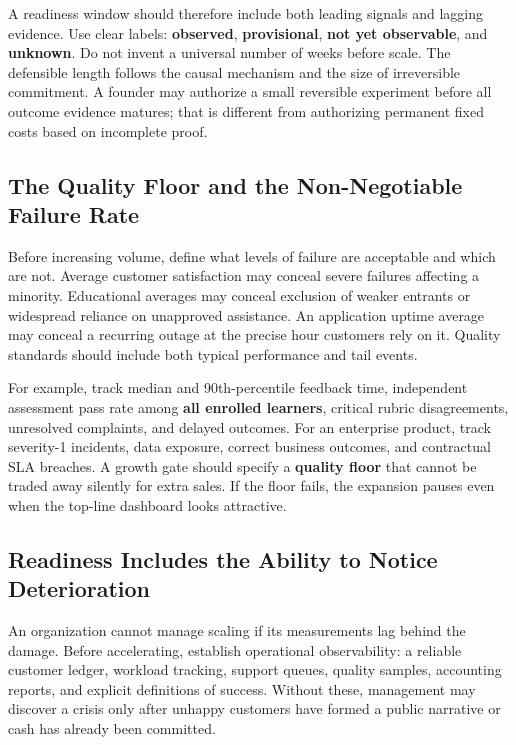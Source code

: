 A readiness window should therefore include both leading signals and lagging evidence. Use clear labels: \textbf{observed}, \textbf{provisional}, \textbf{not yet observable}, and \textbf{unknown}. Do not invent a universal number of weeks before scale. The defensible length follows the causal mechanism and the size of irreversible commitment. A founder may authorize a small reversible experiment before all outcome evidence matures; that is different from authorizing permanent fixed costs based on incomplete proof.

\subsection{The Quality Floor and the Non-Negotiable Failure Rate}
\label{sec:quality_floor_failure_rate}

Before increasing volume, define what levels of failure are acceptable and which are not. Average customer satisfaction may conceal severe failures affecting a minority. Educational averages may conceal exclusion of weaker entrants or widespread reliance on unapproved assistance. An application uptime average may conceal a recurring outage at the precise hour customers rely on it. Quality standards should include both typical performance and tail events.

For example, track median and 90th-percentile feedback time, independent assessment pass rate among \textbf{all enrolled learners}, critical rubric disagreements, unresolved complaints, and delayed outcomes. For an enterprise product, track severity-1 incidents, data exposure, correct business outcomes, and contractual SLA breaches. A growth gate should specify a \textbf{quality floor} that cannot be traded away silently for extra sales. If the floor fails, the expansion pauses even when the top-line dashboard looks attractive.

\subsection{Readiness Includes the Ability to Notice Deterioration}
\label{sec:ability_to_notice_deterioration}

An organization cannot manage scaling if its measurements lag behind the damage. Before accelerating, establish operational observability: a reliable customer ledger, workload tracking, support queues, quality samples, accounting reports, and explicit definitions of success. Without these, management may discover a crisis only after unhappy customers have formed a public narrative or cash has already been committed.

